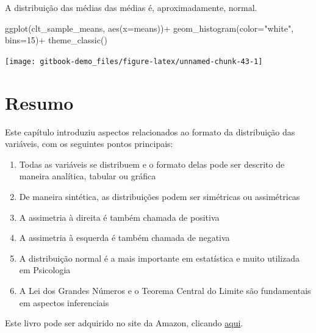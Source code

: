 \documentclass[
]{book}
\newenvironment{Shaded}{\begin{snugshade}}{\end{snugshade}}
\newcommand{\AttributeTok}[1]{\textcolor[rgb]{0.77,0.63,0.00}{#1}}
\newcommand{\DecValTok}[1]{\textcolor[rgb]{0.00,0.00,0.81}{#1}}
\newcommand{\FunctionTok}[1]{\textcolor[rgb]{0.00,0.00,0.00}{#1}}
\newcommand{\NormalTok}[1]{#1}
\newcommand{\SpecialCharTok}[1]{\textcolor[rgb]{0.00,0.00,0.00}{#1}}
\newcommand{\StringTok}[1]{\textcolor[rgb]{0.31,0.60,0.02}{#1}}
\providecommand{\tightlist}{%
  \setlength{\itemsep}{0pt}\setlength{\parskip}{0pt}}
\begin{document}
A distribuição das médias das médias é, aproximadamente, normal.

\begin{Shaded}
\begin{Highlighting}[]
\FunctionTok{ggplot}\NormalTok{(clt\_sample\_means, }\FunctionTok{aes}\NormalTok{(}\AttributeTok{x=}\NormalTok{means))}\SpecialCharTok{+}
  \FunctionTok{geom\_histogram}\NormalTok{(}\AttributeTok{color=}\StringTok{"white"}\NormalTok{, }\AttributeTok{bins=}\DecValTok{15}\NormalTok{)}\SpecialCharTok{+}
  \FunctionTok{theme\_classic}\NormalTok{()}
\end{Highlighting}
\end{Shaded}

\begin{center}\texttt{[image: gitbook-demo\_files/figure-latex/unnamed-chunk-43-1]} \end{center}

\hypertarget{resumo-3}{%
\section{Resumo}\label{resumo-3}}

Este capítulo introduziu aspectos relacionados ao formato da distribuição das variáveis, com os seguintes pontos principais:

\begin{enumerate}
\def\labelenumi{\arabic{enumi}.}
\tightlist
\item
  Todas as variáveis se distribuem e o formato delas pode ser descrito de maneira analítica, tabular ou gráfica\\
\item
  De maneira sintética, as distribuições podem ser simétricas ou assimétricas\\
\item
  A assimetria à direita é também chamada de positiva\\
\item
  A assimetria à esquerda é também chamada de negativa\\
\item
  A distribuição normal é a mais importante em estatística e muito utilizada em Psicologia\\
\item
  A Lei dos Grandes Números e o Teorema Central do Limite são fundamentais em aspectos inferenciais\\
\end{enumerate}

Este livro pode ser adquirido no site da Amazon, clicando \href{https://www.amazon.com.br/gp/product/B097CP7T9M?pf_rd_r=RDZC8XYMBC1WY69T0J8K\&pf_rd_p=abb22e6b-8812-4b76-a424-5f0b098d2c90\&pd_rd_r=ceec1911-f409-4acd-ac8f-2d5bc68dac43\&pd_rd_w=wMUzJ\&pd_rd_wg=ZK85a\&ref_=pd_gw_unk}{aqui}.
\end{document}
